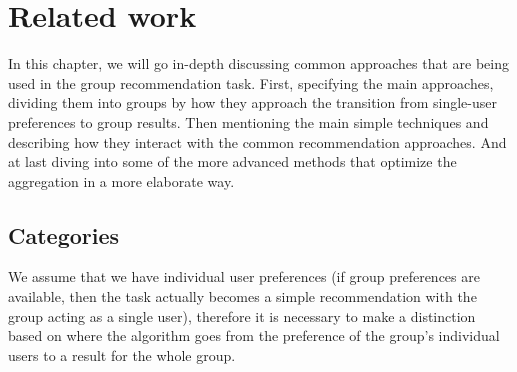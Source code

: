 \chapter{Related work} \label{chap:related_work}
In this chapter, we will go in-depth discussing common approaches that are being used in the group recommendation task. First, specifying the main approaches, dividing them into groups by how they approach the transition from single-user preferences to group results. Then mentioning the main simple techniques and describing how they interact with the common recommendation approaches. And at last diving into some of the more advanced methods that optimize the aggregation in a more elaborate way.

\section{Categories} \label{sec:03_categories}
We assume that we have individual user preferences (if group preferences are available, then the task actually becomes a simple recommendation with the group acting as a single user), therefore it is necessary to make a distinction based on where the algorithm goes from the preference of the group's individual users to a result for the whole group.

